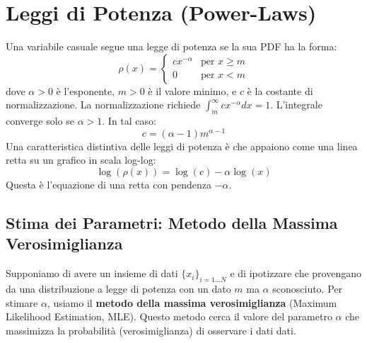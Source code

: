 \section{Leggi di Potenza (Power-Laws)}

Una variabile casuale segue una legge di potenza se la sua PDF ha la forma:
\begin{equation}
\rho(x) = \begin{cases} cx^{-\alpha} & \text{per } x \ge m \\ 0 & \text{per } x < m \end{cases}
\end{equation}
dove $\alpha > 0$ è l'esponente, $m > 0$ è il valore minimo, e $c$ è la costante di normalizzazione.
La normalizzazione richiede $\int_m^\infty cx^{-\alpha} dx = 1$. L'integrale converge solo se $\alpha > 1$. In tal caso:
\begin{equation}
c = (\alpha-1)m^{\alpha-1}
\end{equation}
Una caratteristica distintiva delle leggi di potenza è che appaiono come una linea retta su un grafico in scala log-log:
\begin{equation}
\log(\rho(x)) = \log(c) - \alpha \log(x)
\end{equation}
Questa è l'equazione di una retta con pendenza $-\alpha$.

\subsection{Stima dei Parametri: Metodo della Massima Verosimiglianza}

Supponiamo di avere un insieme di dati $\{x_i\}_{i=1...N}$ e di ipotizzare che provengano da una distribuzione a legge di potenza con un dato $m$ ma $\alpha$ sconosciuto. Per stimare $\alpha$, usiamo il \textbf{metodo della massima verosimiglianza} (Maximum Likelihood Estimation, MLE). Questo metodo cerca il valore del parametro $\alpha$ che massimizza la probabilità (verosimiglianza) di osservare i dati dati.

